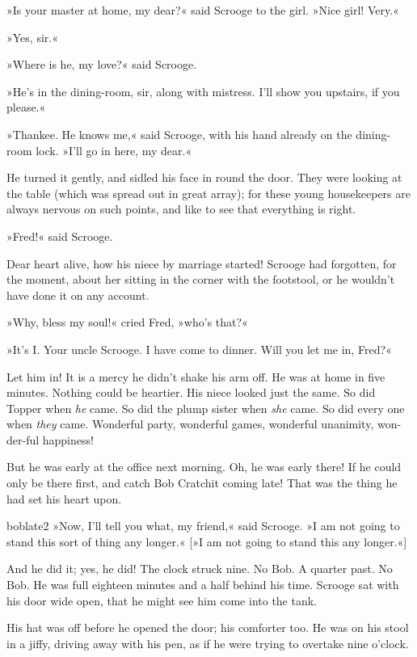 »Is your master at home, my dear?« said Scrooge to the girl. »Nice girl! Very.«

»Yes, sir.«

»Where is he, my love?« said Scrooge.

»He's in the dining-room, sir, along with mistress. I'll show you upstairs, if you please.«

»Thankee. He knows me,« said Scrooge, with his hand already on the dining-room lock. »I'll go in here, my dear.«

He turned it gently, and sidled his face in round the door. They were looking at the table (which was spread out in great array); for these young housekeepers are always nervous on such points, and like to see that everything is right.

»Fred!« said Scrooge.

Dear heart alive, how his niece by marriage started! Scrooge had forgotten, for the moment, about her sitting in the corner with the footstool, or he wouldn't have done it on any account.

»Why, bless my soul!« cried Fred, »who's that?«

»It's I. Your uncle Scrooge. I have come to dinner. Will you let me in, Fred?«

Let him in! It is a mercy he didn't shake his arm off. He was at home in five minutes. Nothing could be heartier. His niece looked just the same. So did Topper when \textit{he} came. So did the plump sister when \textit{she} came. So did every one when \textit{they} came. Wonderful party, wonderful games, wonderful unanimity, won-der-ful happiness!

But he was early at the office next morning. Oh, he was early there! If he could only be there first, and catch Bob Cratchit coming late! That was the thing he had set his heart upon.

\begin{colorbigpic}
	[1.15]
	{boblate2}
	{»Now, I'll tell you what, my friend,« said Scrooge. »I am not going to stand this sort of thing any longer.«}
	[»I am not going to stand this any longer.«]
\end{colorbigpic}


And he did it; yes, he did! The clock struck nine. No Bob. A quarter past. No Bob. He was full eighteen minutes and a half behind his time. Scrooge sat with his door wide open, that he might see him come into the tank.

His hat was off before he opened the door; his comforter too. He was on his stool in a jiffy, driving away with his pen, as if he were trying to overtake nine o'clock.

